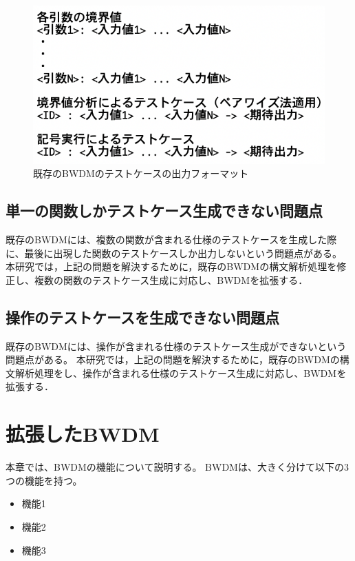 \documentclass[uplatex, report, a4j, 10pt]{jsbook}
\newcommand{\tool}{BWDM}
\begin{document}
\begin{figure}[t]
  \begin{center}
    \includegraphics[keepaspectratio, width=160mm]{figs/bwdm_format.png}
    \caption{既存のBWDMのテストケースの出力フォーマット}
    \label{fig:bwdm_format}
  \end{center}
\end{figure}

\section{単一の関数しかテストケース生成できない問題点}
既存の\tool{}には、複数の関数が含まれる仕様のテストケースを生成した際に、最後に出現した関数のテストケースしか出力しないという問題点がある。
本研究では，上記の問題を解決するために，既存の\tool{}の構文解析処理を修正し、複数の関数のテストケース生成に対応し、\tool{}を拡張する．


\section{操作のテストケースを生成できない問題点}
既存の\tool{}には、操作が含まれる仕様のテストケース生成ができないという問題点がある。
本研究では，上記の問題を解決するために，既存の\tool{}の構文解析処理をし、操作が含まれる仕様のテストケース生成に対応し、\tool{}を拡張する．



\chapter{拡張した\tool{}}\label{cha:Extended}

本章では、\tool{}の機能について説明する。
\tool{}は、大きく分けて以下の3つの機能を持つ。

\begin{itemize}
  \item 機能1
  \item 機能2
  \item 機能3
\end{itemize}
\end{document}
